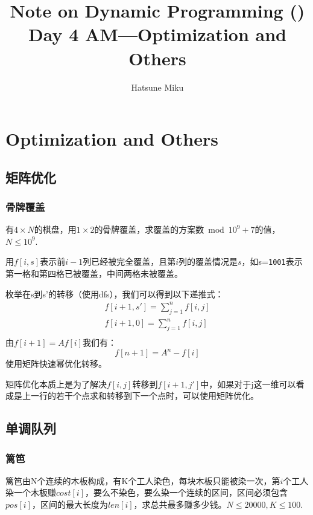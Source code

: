 \documentclass{article}
\newcommand{\romannum}[1]{\uppercase\expandafter{\romannumeral#1}}
\begin{document}
\title{Note on Dynamic Programming (\romannum{4})\\\large{Day 4 AM---Optimization and Others}}\date{}\author{Hatsune Miku}
\maketitle
\section{Optimization and Others}
\subsection{矩阵优化}
\subsubsection{骨牌覆盖}
有$4\times N$的棋盘，用$1\times 2$的骨牌覆盖，求覆盖的方案数$\bmod 10^9+7$的值，$N\le 10^9$.

用$f[i,s]$表示前$i-1$列已经被完全覆盖，且第$i$列的覆盖情况是$s$，如s=\verb+1001+表示第一格和第四格已被覆盖，中间两格未被覆盖。

枚举在s到s'的转移（使用dfs），我们可以得到以下递推式：
\begin{equation*}
    \begin{aligned}
        f[i+1,s']=\sum_{j=1}^nf[i,j]\\
        f[i+1,0]=\sum_{j=1}^nf[i,j]\\
    \end{aligned}
\end{equation*}
由$f[i+1]=Af[i]$我们有：
\begin{equation*}
    f[n+1]=A^n-f[i]
\end{equation*}
使用矩阵快速幂优化转移。

矩阵优化本质上是为了解决$f[i,j]$转移到$f[i+1,j']$中，如果对于j这一维可以看成是上一行的若干个点求和转移到下一个点时，可以使用矩阵优化。
\subsection{单调队列}
\subsubsection{篱笆}
篱笆由N个连续的木板构成，有K个工人染色，每块木板只能被染一次，第$i$个工人染一个木板赚$cost[i]$，要么不染色，要么染一个连续的区间，区间必须包含$pos[i]$，区间的最大长度为$len[i]$，求总共最多赚多少钱。$N\le 20000, K\le 100.$
\end{document}
